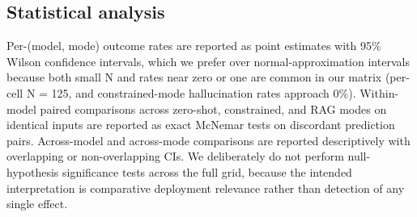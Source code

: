 \subsection{Statistical analysis}\label{statistical-analysis}

Per-(model, mode) outcome rates are reported as point estimates
with 95\% Wilson confidence intervals, which we prefer over
normal-approximation intervals because both small N and rates near
zero or one are common in our matrix (per-cell N = 125, and
constrained-mode hallucination rates approach 0\%). Within-model
paired comparisons across zero-shot, constrained, and RAG modes on
identical inputs are reported as exact McNemar tests on discordant
prediction pairs. Across-model and across-mode comparisons are
reported descriptively with overlapping or non-overlapping CIs. We
deliberately do not perform null-hypothesis significance tests
across the full grid, because the intended interpretation is
comparative deployment relevance rather than detection of any
single effect.
